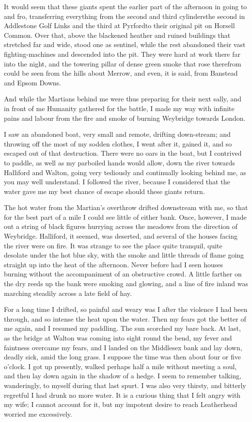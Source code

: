 It would seem that these giants spent the earlier part of the
afternoon in going to and fro, transferring everything from the
second and third cylinders\dash{}the second in Addlestone Golf Links and
the third at Pyrford\dash{}to their original pit on Horsell Common. Over
that, above the blackened heather and ruined buildings that
stretched far and wide, stood one as sentinel, while the rest
abandoned their vast fighting-machines and descended into the pit.
They were hard at work there far into the night, and the towering
pillar of dense green smoke that rose therefrom could be seen from
the hills about Merrow, and even, it is said, from Banstead and
Epsom Downs.

And while the Martians behind me were thus preparing for their next
sally, and in front of me Humanity gathered for the battle, I made
my way with infinite pains and labour from the fire and smoke of
burning Weybridge towards London.

I saw an abandoned boat, very small and remote, drifting
down-stream; and throwing off the most of my sodden clothes, I went
after it, gained it, and so escaped out of that destruction. There
were no oars in the boat, but I contrived to paddle, as well as my
parboiled hands would allow, down the river towards Halliford and
Walton, going very tediously and continually looking behind me, as
you may well understand. I followed the river, because I considered
that the water gave me my best chance of escape should these giants
return.

The hot water from the Martian's overthrow drifted downstream with
me, so that for the best part of a mile I could see little of
either bank. Once, however, I made out a string of black figures
hurrying across the meadows from the direction of Weybridge.
Halliford, it seemed, was deserted, and several of the houses
facing the river were on fire. It was strange to see the place
quite tranquil, quite desolate under the hot blue sky, with the
smoke and little threads of flame going straight up into the heat
of the afternoon. Never before had I seen houses burning without
the accompaniment of an obstructive crowd. A little farther on the
dry reeds up the bank were smoking and glowing, and a line of fire
inland was marching steadily across a late field of hay.

For a long time I drifted, so painful and weary was I after the
violence I had been through, and so intense the heat upon the
water. Then my fears got the better of me again, and I resumed my
paddling. The sun scorched my bare back. At last, as the bridge at
Walton was coming into sight round the bend, my fever and faintness
overcame my fears, and I landed on the Middlesex bank and lay down,
deadly sick, amid the long grass. I suppose the time was then about
four or five o'clock. I got up presently, walked perhaps half a
mile without meeting a soul, and then lay down again in the shadow
of a hedge. I seem to remember talking, wanderingly, to myself
during that last spurt. I was also very thirsty, and bitterly
regretful I had drunk no more water. It is a curious thing that I
felt angry with my wife; I cannot account for it, but my impotent
desire to reach Leatherhead worried me excessively.


